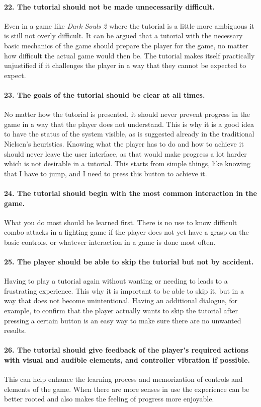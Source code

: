 \paragraph{22. The tutorial should not be made unnecessarily difficult.}
Even in a game like \textit{Dark Souls 2} where the tutorial is a little more ambiguous it is still not overly difficult. It can be argued that a tutorial with the necessary basic mechanics of the game should prepare the player for the game, no matter how difficult the actual game would then be. The tutorial makes itself practically unjustified if it challenges the player in a way that they cannot be expected to expect.
\paragraph{23. The goals of the tutorial should be clear at all times.}
No matter how the tutorial is presented, it should never prevent progress in the game in a way that the player does not understand. This is why it is a good idea to have the status of the system visible, as is suggested already in the traditional Nielsen's heuristics. Knowing what the player has to do and how to achieve it should never leave the user interface, as that would make progress a lot harder which is not desirable in a tutorial. This starts from simple things, like knowing that I have to jump, and I need to press this button to achieve it.
\paragraph{24. The tutorial should begin with the most common interaction in the game.}
What you do most should be learned first. There is no use to know difficult combo attacks in a fighting game if the player does not yet have a grasp on the basic controls, or whatever interaction in a game is done most often. 
\paragraph{25. The player should be able to skip the tutorial but not by accident.}
Having to play a tutorial again without wanting or needing to leads to a frustrating experience. This why it is important to be able to skip it, but in a way that does not become unintentional. Having an additional dialogue, for example, to confirm that the player actually wants to skip the tutorial after pressing a certain button is an easy way to make sure there are no unwanted results.
\paragraph{26. The tutorial should give feedback of the player's required actions with visual and audible elements, and controller vibration if possible.}
This can help enhance the learning process and memorization of controls and elements of the game. When there are more senses in use the experience can be better rooted and also makes the feeling of progress more enjoyable.
